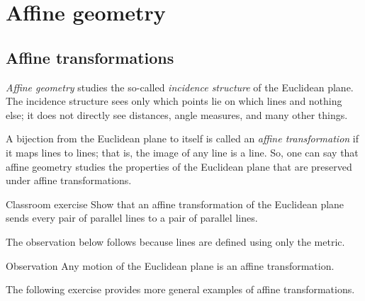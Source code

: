 
\chapter{Affine geometry}\label{chap:trans}

\section{Affine transformations}

\emph{Affine geometry} studies the so-called \emph{incidence structure} of the Euclidean plane.
The incidence structure sees only which points lie on which lines and nothing else;
it does not directly see distances, angle measures, and many other things.

A bijection from the Euclidean plane to itself is called an \emph{affine transformation} if it maps lines to lines;
that is, the image of any line is a line.
So, one can say that affine geometry studies the properties of the Euclidean plane that are preserved under affine transformations.

\begin{thm}[!]{Classroom exercise}\label{ex:affine-par}
Show that an affine transformation of the Euclidean plane sends every pair of parallel lines to a pair of parallel lines.
\end{thm}

The observation below follows because lines are defined using only the metric.

\begin{thm}{Observation}
Any motion of the Euclidean plane is an affine transformation.
\end{thm}

The following exercise provides more general examples of affine transformations.


